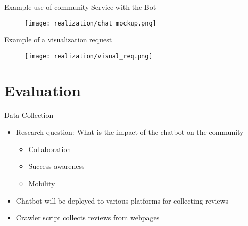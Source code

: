 \begin{frame}{Example use of community Service with the Bot}
  \begin{figure}
    \centering
    \texttt{[image: realization/chat\_mockup.png]}

  \end{figure}
\end{frame}

\begin{frame}{Example of a visualization request}
  \begin{figure}
    \centering
    \texttt{[image: realization/visual\_req.png]}

    \label{fig:visualReq}
  \end{figure}
\end{frame}

\section{Evaluation}


\begin{frame}{Data Collection}
  \begin{itemize}
    \item Research question: What is the impact of the chatbot on the community
          \begin{itemize}
            \item Collaboration
            \item Success awareness
            \item Mobility
          \end{itemize}

    \item Chatbot will be deployed to various platforms for collecting reviews
    \item Crawler script collects reviews from webpages
  \end{itemize}
\end{frame}

